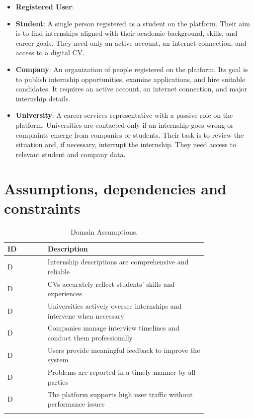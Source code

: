 \begin{itemize}
    \item \textbf{Registered User}:
    \item \textbf{Student}: A single person registered as a student on the platform. Their aim is to find internships aligned with their academic background, skills, and career goals. They need only an active account, an internet connection, and access to a digital CV.
    \item \textbf{Company}: An organization of people registered on the platform. Its goal is to publish internship opportunities, examine applications, and hire suitable candidates. It requires an active account, an internet connection, and major internship details.
    \item \textbf{University}: A career services representative with a passive role on the platform. Universities are contacted only if an internship goes wrong or complaints emerge from companies or students. Their task is to review the situation and, if necessary, interrupt the internship. They need access to relevant student and company data.
\end{itemize}

\section{Assumptions, dependencies and constraints}
\label{sec:assumptions_dependencies_and_constraints}%
\setcounter{da}{1}
\newcommand{\cda}{D\arabic{da}\stepcounter{da}} 
\begin{center}
    \renewcommand{\arraystretch}{2}
    \begin{longtable}{ l p{0.8\linewidth} } 
        \hline
        \textbf{ID} & \textbf{Description} \\ 
        \hline
        \cda & Internship descriptions are comprehensive and reliable \\ \hline
        \cda & CVs accurately reflect students' skills and experiences \\ \hline
        \cda & Universities actively oversee internships and intervene when necessary \\ \hline
        \cda & Companies manage interview timelines and conduct them professionally \\ \hline
        \cda & Users provide meaningful feedback to improve the system \\ \hline
        \cda & Problems are reported in a timely manner by all parties \\ \hline
        \cda & The platform supports high user traffic without performance issues \\ \hline
        \caption{Domain Assumptions.}
        \label{tab:worldph_tab}%
    \end{longtable}
\end{center}

